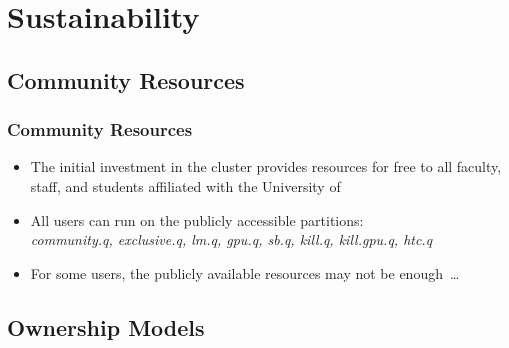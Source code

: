 \section{Sustainability}
\subsection{Community Resources}
\begin{frame}
	\frametitle{Community Resources}
	\begin{itemize}
		\item The initial investment in the cluster provides resources for free to all faculty, staff, and students affiliated with the University of {\hawaii}
		\item All users can run on the publicly accessible partitions:\\ \emph{community.q, exclusive.q, lm.q, gpu.q, sb.q, kill.q, kill.gpu.q, htc.q}
		\item For some users, the publicly available resources may not be enough~\ldots
	\end{itemize}
\end{frame}

\subsection{Ownership Models}


